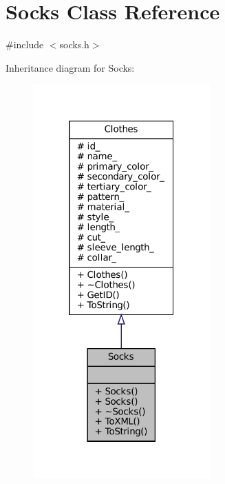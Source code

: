 \hypertarget{classSocks}{}\section{Socks Class Reference}
\label{classSocks}


{\ttfamily \#include $<$socks.\+h$>$}



Inheritance diagram for Socks\+:\nopagebreak
\begin{figure}[H]
\begin{center}
\leavevmode
\includegraphics[width=193pt]{classSocks__inherit__graph}
\end{center}
\end{figure}


